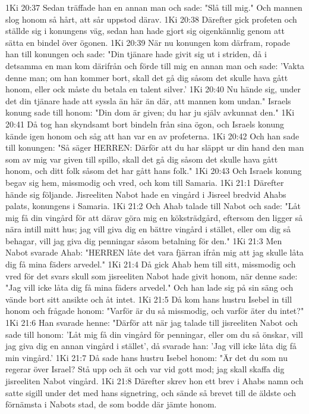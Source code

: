 1Ki 20:37  Sedan träffade han en annan man och sade: "Slå till mig." Och mannen slog honom så hårt, att sår uppstod därav.
1Ki 20:38  Därefter gick profeten och ställde sig i konungens väg, sedan han hade gjort sig oigenkännlig genom att sätta en bindel över ögonen.
1Ki 20:39  När nu konungen kom därfram, ropade han till konungen och sade: "Din tjänare hade givit sig ut i striden, då i detsamma en man kom därifrån och förde till mig en annan man och sade: 'Vakta denne man; om han kommer bort, skall det gå dig såsom det skulle hava gått honom, eller ock måste du betala en talent silver.'
1Ki 20:40  Nu hände sig, under det din tjänare hade att syssla än här än där, att mannen kom undan." Israels konung sade till honom: "Din dom är given; du har ju själv avkunnat den."
1Ki 20:41  Då tog han skyndsamt bort bindeln från sina ögon, och Israels konung kände igen honom och såg att han var en av profeterna.
1Ki 20:42  Och han sade till konungen: "Så säger HERREN: Därför att du har släppt ur din hand den man som av mig var given till spillo, skall det gå dig såsom det skulle hava gått honom, och ditt folk såsom det har gått hans folk."
1Ki 20:43  Och Israels konung begav sig hem, missmodig och vred, och kom till Samaria.
1Ki 21:1  Därefter hände sig följande. Jisreeliten Nabot hade en vingård i Jisreel bredvid Ahabs palats, konungens i Samaria.
1Ki 21:2  Och Ahab talade till Nabot och sade: "Låt mig få din vingård för att därav göra mig en köksträdgård, eftersom den ligger så nära intill mitt hus; jag vill giva dig en bättre vingård i stället, eller om dig så behagar, vill jag giva dig penningar såsom betalning för den."
1Ki 21:3  Men Nabot svarade Ahab: "HERREN låte det vara fjärran ifrån mig att jag skulle låta dig få mina fäders arvedel."
1Ki 21:4  Då gick Ahab hem till sitt, missmodig och vred för det svars skull som jisreeliten Nabot hade givit honom, när denne sade: "Jag vill icke låta dig få mina fäders arvedel." Och han lade sig på sin säng och vände bort sitt ansikte och åt intet.
1Ki 21:5  Då kom hans hustru Isebel in till honom och frågade honom: "Varför är du så missmodig, och varför äter du intet?"
1Ki 21:6  Han svarade henne: "Därför att när jag talade till jisreeliten Nabot och sade till honom: 'Låt mig få din vingård för penningar, eller om du så önskar, vill jag giva dig en annan vingård i stället', då svarade han: 'Jag vill icke låta dig få min vingård.'
1Ki 21:7  Då sade hans hustru Isebel honom: "Är det du som nu regerar över Israel? Stå upp och ät och var vid gott mod; jag skall skaffa dig jisreeliten Nabot vingård.
1Ki 21:8  Därefter skrev hon ett brev i Ahabs namn och satte sigill under det med hans signetring, och sände så brevet till de äldste och förnämsta i Nabots stad, de som bodde där jämte honom.
